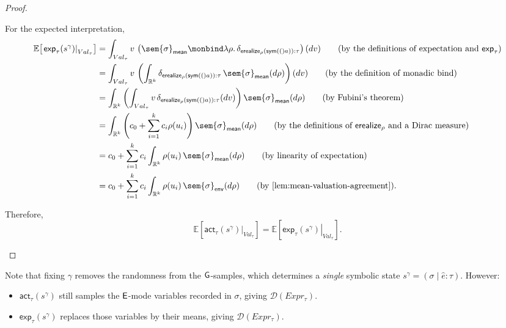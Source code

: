 \begin{proof}
\begin{enumerate}
    For the expected interpretation,
    \begin{align}
      \mathbb E\!\left[
        \left.\mathsf{exp}_\tau(s^\gamma)\right|_{Val_\tau}
      \right]
      &=
      \int_{Val_\tau}
        v\,
        \left(
          \sem{\sigma}_{\mathsf{mean}}
          \monbind
          \lambda\rho.\,
          \delta_{\mathsf{erealize}_\rho(\sym(a)):\tau}
        \right)(dv)
      \tag{\text{by the definitions of expectation and $\mathsf{exp}_\tau$}}
      \\
      &=
      \int_{Val_\tau}
        v\,
        \left(
          \int_{\mathbb R^k}
            \delta_{\mathsf{erealize}_\rho(\sym(a)):\tau}
            \,\sem{\sigma}_{\mathsf{mean}}(d\rho)
        \right)(dv)
      \tag{\text{by the definition of monadic bind}}
      \\
      &=
      \int_{\mathbb R^k}
        \left(
          \int_{Val_\tau}
            v\,
            \delta_{\mathsf{erealize}_\rho(\sym(a)):\tau}(dv)
        \right)
        \sem{\sigma}_{\mathsf{mean}}(d\rho)
      \tag{\text{by Fubini's theorem}}
      \\
      &=
      \int_{\mathbb R^k}
        \left(
          c_0+\sum_{i=1}^k c_i\rho(u_i)
        \right)
        \sem{\sigma}_{\mathsf{mean}}(d\rho)
      \tag{\text{by the definitions of $\mathsf{erealize}_\rho$ and a Dirac measure}}
      \\
      &=
      c_0+
      \sum_{i=1}^k
        c_i
        \int_{\mathbb R^k}
          \rho(u_i)\,
          \sem{\sigma}_{\mathsf{mean}}(d\rho)
      \tag{\text{by linearity of expectation}}
      \\
      &=
      c_0+
      \sum_{i=1}^k
        c_i
        \int_{\mathbb R^k}
          \rho(u_i)\,
          \sem{\sigma}_{\mathsf{env}}(d\rho)
      \tag{\text{by \Cref{lem:mean-valuation-agreement}}}.
    \end{align}

    Therefore,
    \[
      \mathbb E\!\left[
        \left.\mathsf{act}_\tau(s^\gamma)\right|_{Val_\tau}
      \right]
      =
      \mathbb E\!\left[
        \left.\mathsf{exp}_\tau(s^\gamma)\right|_{Val_\tau}
      \right].
    \]
  \end{enumerate}
\end{proof}

Note that fixing $\gamma$ removes the randomness from the $\mathsf{G}$-samples, which determines a \emph{single} symbolic state $s^\gamma
=
(\sigma\mid\hat e:\tau)$. However:

\begin{itemize}
  \item $\mathsf{act}_\tau(s^\gamma)$ still samples the $\mathsf{E}$-mode variables recorded in $\sigma$, giving $\mathcal{D}(Expr_\tau)$.
  \item $\mathsf{exp}_\tau(s^\gamma)$ replaces those variables by their means, giving $\mathcal{D}(Expr_\tau)$.
\end{itemize}


